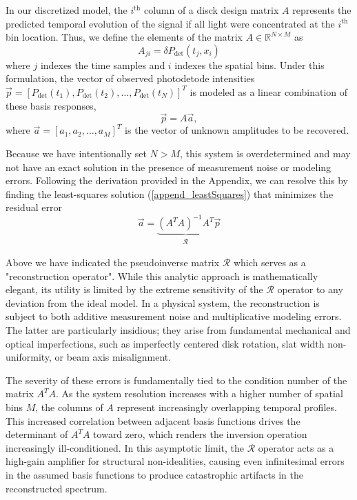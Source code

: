 \documentclass[12pt]{report}
\begin{document}
	In our discretized model, the $i^\mathrm{th}$ column of a disck design matrix $A$ represents the predicted temporal evolution of the signal if all light were concentrated at the $i^\mathrm{th}$ bin location. Thus, we define the elements of the matrix $A \in \mathbb{R}^{N \times M}$ as
	\begin{equation}
		A_{ji} = \delta P_\mathrm{det}(t_j, x_i)
	\end{equation}
	where $j$ indexes the time samples and $i$ indexes the spatial bins. Under this formulation, the vector of observed photodetode intensities $\vec{p} = [P_\mathrm{det}(t_1), P_\mathrm{det}(t_2), \ldots, P_\mathrm{det}(t_N)]^T$ is modeled as a linear combination of these basis responses,
	\begin{equation}
		\vec{p} = A\vec{a},
	\end{equation}
	where $\vec{a} = [a_1, a_2, \ldots, a_M]^T$ is the vector of unknown amplitudes to be recovered.
	
	Because we have intentionally set $N > M$, this system is overdetermined and may not have an exact solution in the presence of measurement noise or modeling errors. Following the derivation provided in the Appendix, we can resolve this by finding the least-squares solution (\ref{append_leastSquares}) that minimizes the residual error
	\begin{equation}
		\vec{a} = \underbrace{(A^T A)^{-1} A^T}_{\begin{matrix} \mathcal{R} \end{matrix}} \vec{p}
	\end{equation}
	
	
	Above we have indicated the pseudoinverse matrix $\mathcal{R}$ which serves as a "reconstruction operator". While this analytic approach is mathematically elegant, its utility is limited by the extreme sensitivity of the $\mathcal{R}$ operator to any deviation from the ideal model. In a physical system, the reconstruction is subject to both additive measurement noise and multiplicative modeling errors. The latter are particularly insidious; they arise from fundamental mechanical and optical imperfections, such as imperfectly centered disk rotation, slat width non-uniformity, or beam axis misalignment.
	
	The severity of these errors is fundamentally tied to the condition number of the matrix $A^T A$. As the system resolution increases with a higher number of spatial bins $M$, the columns of $A$ represent increasingly overlapping temporal profiles. This increased correlation between adjacent basis functions drives the determinant of $A^T A$ toward zero, which renders the inversion operation increasingly ill-conditioned. In this asymptotic limit, the $\mathcal{R}$ operator acts as a high-gain amplifier for structural non-idealities, causing even infinitesimal errors in the assumed basis functions to produce catastrophic artifacts in the reconstructed spectrum.
	
\end{document}
